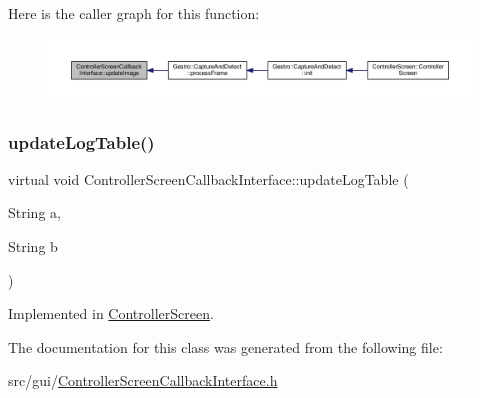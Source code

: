 Here is the caller graph for this function\+:
\nopagebreak
\begin{figure}[H]
\begin{center}
\leavevmode
\includegraphics[width=350pt]{class_controller_screen_callback_interface_a7d11a5d40ead88e7f89b8b1ee836b0cd_icgraph}
\end{center}
\end{figure}
\mbox{\label{class_controller_screen_callback_interface_af92ab0514459c690e357064676fa33f0}} 
\subsubsection{\texorpdfstring{update\+Log\+Table()}{updateLogTable()}}
{\footnotesize\ttfamily virtual void Controller\+Screen\+Callback\+Interface\+::update\+Log\+Table (\begin{DoxyParamCaption}\item[{String}]{a,  }\item[{String}]{b }\end{DoxyParamCaption})\hspace{0.3cm}{\ttfamily [pure virtual]}}



Implemented in \hyperlink{class_controller_screen_a039b816adc94fc7e7757520c10fd1d0b}{Controller\+Screen}.



The documentation for this class was generated from the following file\+:\begin{DoxyCompactItemize}
\item 
src/gui/\hyperlink{_controller_screen_callback_interface_8h}{Controller\+Screen\+Callback\+Interface.\+h}\end{DoxyCompactItemize}
